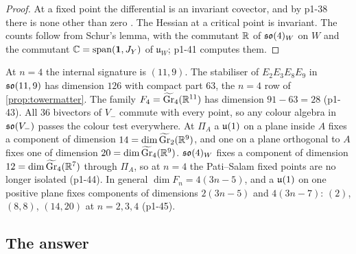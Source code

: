 \begin{proof}
At a fixed point the differential is an invariant covector, and by p1-38 there is none other than zero \cite{Michel71,Palais79}. The Hessian at a critical point is invariant. The
counts follow from Schur's lemma, with the commutant $\mathbb{R}$ of $\mathfrak{so}(4)_W$ on $W$ and the commutant $\mathbb{C}=\operatorname{span}(\mathbf 1,J_Y)$ of $\mathfrak u_W$; p1-41 computes them.
\end{proof}

\begin{remark}
\label{p1:rem:n4}
At $n=4$ the internal signature is $(11,9)$. The stabiliser of $E_2E_3E_8E_9$ in $\mathfrak{so}(11,9)$ has dimension $126$ with compact part $63$, the $n=4$ row of
\cref{prop:towermatter}. The family $F_4=\widetilde{\mathrm{Gr}}_4(\mathbb{R}^{11})$ has dimension $91-63=28$ (p1-43). All $36$ bivectors of $V_-$ commute with every point, so any
colour algebra in $\mathfrak{so}(V_-)$ passes the colour test everywhere. At $\Pi_A$ a $\mathfrak{u}(1)$ on a plane inside $A$ fixes a component of dimension $14=\dim\widetilde{\mathrm{Gr}}_2(\mathbb{R}^9)$,
and one on a plane orthogonal to $A$ fixes one of dimension $20=\dim\widetilde{\mathrm{Gr}}_4(\mathbb{R}^9)$. $\mathfrak{so}(4)_W$ fixes a component of dimension $12=\dim\widetilde{\mathrm{Gr}}_4(\mathbb{R}^7)$
through $\Pi_A$, so at $n=4$ the Pati--Salam fixed points are no longer isolated (p1-44). In general $\dim F_n=4(3n-5)$, and a $\mathfrak{u}(1)$ on one positive plane fixes components of
dimensions $2(3n-5)$ and $4(3n-7)$: $(2)$, $(8,8)$, $(14,20)$ at $n=2,3,4$ (p1-45).
\end{remark}

\subsection{The answer}
\label{p1:sec:answer}

